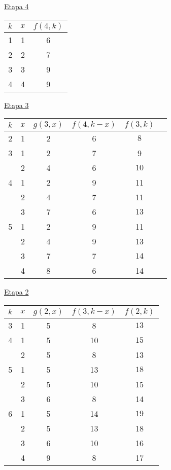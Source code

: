 \documentclass[twoside]{article}
\begin{document}
\begin{ejercicio}{4}
\begin{solucion}
\underline{Etapa 4}
\begin{center}
\begin{tabular}{|c|c|c|}
\hline
$k$ & $x$ & $f(4,k)$\\
\hline
1 & 1 & 6\\
2 & 2 & 7\\
3 & 3 & 9\\
4 & 4 & 9\\
\hline
\end{tabular}
\end{center}
\newpage
\underline{Etapa 3}
\begin{center}
\begin{tabular}{|c|c|c|c|c|c|}
\hline
$k$ & $x$ & $g(3,x)$ & $f(4,k-x)$ & $f(3,k)$\\
\hline
2 & 1 & 2 & 6 & $\boxed{8}$\\
\hline
3 & 1 & 2 & 7 & 9\\ 
  & 2 & 4 & 6 & $\boxed{10}$\\
\hline
4 & 1 & 2 & 9 & 11\\
  & 2 & 4 & 7 & 11\\
  & 3 & 7 & 6 & $\boxed{13}$\\
  \hline
5 & 1 & 2 & 9 & 11\\
  & 2 & 4 & 9 & 13\\
  & 3 & 7 & 7 & $\boxed{14}$\\
  & 4 & 8 & 6 & 14\\
  \hline
\end{tabular}
\end{center}
\underline{Etapa 2}
\begin{center}
\begin{tabular}{|c|c|c|c|c|}
\hline
$k$ & $x$ & $g(2,x)$ & $ f(3,k-x)$ & $f(2,k)$\\
\hline 
3 & 1 & 5 & 8 & $\boxed{13}$\\
\hline
4 & 1 & 5 & 10 & $\boxed{15}$\\
  & 2 & 5 & 8 & 13\\
  \hline
5 & 1 & 5 & 13 & $\boxed{18}$\\
  & 2 & 5 & 10 & 15\\
  & 3 & 6 & 8 & 14\\
  \hline
6 & 1 & 5 & 14 & $\boxed{19}$\\
  & 2 & 5 & 13 & 18\\
  & 3 & 6 & 10 & 16\\
  & 4 & 9 & 8  & 17\\
  \hline
\end{tabular}
\end{center}

\end{solucion}
\end{ejercicio}
\end{document}
